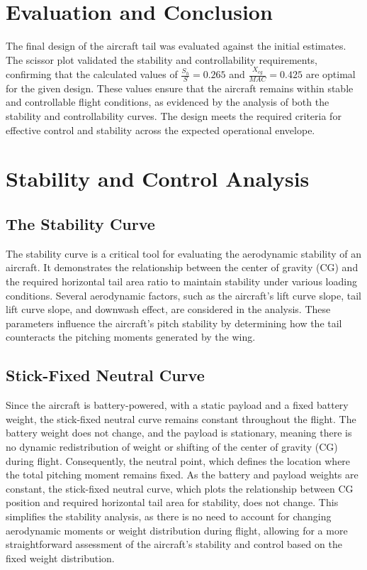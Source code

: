 \documentclass[12pt]{report}
\begin{document}
\chapter{Evaluation and Conclusion}

The final design of the aircraft tail was evaluated against the initial estimates. The scissor plot validated the stability and controllability requirements, confirming that the calculated values of \( \frac{S_h}{S} = 0.265 \) and \( \frac{X_{cg}}{MAC} = 0.425 \) are optimal for the given design. These values ensure that the aircraft remains within stable and controllable flight conditions, as evidenced by the analysis of both the stability and controllability curves. The design meets the required criteria for effective control and stability across the expected operational envelope.

\chapter{Stability and Control Analysis}

\section{The Stability Curve}

The stability curve is a critical tool for evaluating the aerodynamic stability of an aircraft. It demonstrates the relationship between the center of gravity (CG) and the required horizontal tail area ratio to maintain stability under various loading conditions. Several aerodynamic factors, such as the aircraft's lift curve slope, tail lift curve slope, and downwash effect, are considered in the analysis. These parameters influence the aircraft's pitch stability by determining how the tail counteracts the pitching moments generated by the wing.

\section{Stick-Fixed Neutral Curve}
Since the aircraft is battery-powered, with a static payload and a fixed battery weight, the stick-fixed neutral curve remains constant throughout the flight. The battery weight does not change, and the payload is stationary, meaning there is no dynamic redistribution of weight or shifting of the center of gravity (CG) during flight. Consequently, the neutral point, which defines the location where the total pitching moment remains fixed. As the battery and payload weights are constant, the stick-fixed neutral curve, which plots the relationship between CG position and required horizontal tail area for stability, does not change. This simplifies the stability analysis, as there is no need to account for changing aerodynamic moments or weight distribution during flight, allowing for a more straightforward assessment of the aircraft's stability and control based on the fixed weight distribution.
\end{document}
